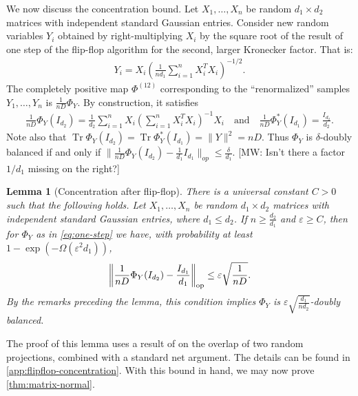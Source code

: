\documentclass[aos]{imsart}
\newtheorem{lemma}[theorem]{Lemma}
\theoremstyle{definition}
\numberwithin{equation}{section}
\DeclareMathOperator{\op}{op}
\DeclareMathOperator{\tr}{Tr}
\DeclarePairedDelimiter{\norm}{\lVert}{\rVert}
\newcommand{\eps}{\varepsilon}
\newcommand{\MW}[1]{{\color{red}[MW: #1]}}
\begin{document}
We now discuss the concentration bound.
Let $X_1,\dots,X_n$ be random $d_1 \times d_2$ matrices with independent standard Gaussian entries.
Consider new random variables $Y_i$ obtained by right-multiplying $X_i$ by the square root of the result of one step of the flip-flop algorithm for the second, larger Kronecker factor.
That is:
\begin{align*}
  Y_i = X_i \left( \frac1{nd_1} \sum_{i=1}^n X_i^T X_i \right)^{-1/2}.
\end{align*}
The completely positive map $\Phi^{(12)}$ corresponding to the ``renormalized'' samples $Y_1,\dots,Y_n$ is $\frac1{nD} \Phi_Y$.
By construction, it satisfies
\begin{align}\label{eq:one-step}
  \frac1{n D} \Phi_Y(I_{d_2}) = \frac1{d_2} \sum_{i=1}^{n} X_i \left( \sum_{i=1}^n X_i^T X_i \right)^{-1} X_i
\quad\text{and}\quad
  \frac1{n D} \Phi^*_Y(I_{d_1}) = \frac{I_{d_2}}{d_2}.
\end{align}
Note also that $\tr \Phi_Y(I_{d_2}) = \tr \Phi_Y^*(I_{d_1}) = \|Y\|^2 = nD$. Thus $\Phi_Y$ is $\delta$-doubly balanced if and only if $\|\frac{1}{nD} \Phi_Y(I_{d_2}) - \frac{1}{d_1} I_{d_1}\|_{op} \leq \frac{\delta}{d_1}$.
\MW{Isn't there a factor $1/d_1$ missing on the right?}

\begin{lemma}[Concentration after flip-flop]\label{lem:flipflop-concentration}
There is a universal constant $C>0$ such that the following holds.
Let $X_1,\dots,X_n$ be random $d_1 \times d_2$ matrices with independent standard Gaussian entries, where $d_1 \leq d_2$.
If $n \geq \frac{d_2}{d_1}$ and $\eps\geq C$, then for $\Phi_Y$ as in \cref{eq:one-step} we have, with probability at least $1 - \exp(- \Omega( \eps^2 d_{1}))$,
\begin{align*}
  \norm*{\frac1{n D} \Phi_Y(I_{d_2}) - \frac{I_{d_1}}{d_1}}_{\op} \leq \eps \sqrt{\frac1{nD}}.
\end{align*}
By the remarks preceding the lemma, this condition implies $\Phi_Y$ is $\eps \sqrt{\frac{d_1}{nd_2}}$-doubly balanced.
\end{lemma}

The proof of this lemma uses a result of \cite{hayden2006aspects} on the overlap of two random projections, combined with a standard net argument.
The details can be found in \cref{app:flipflop-concentration}.
With this bound in hand, we may now prove \cref{thm:matrix-normal}.
\end{document}
